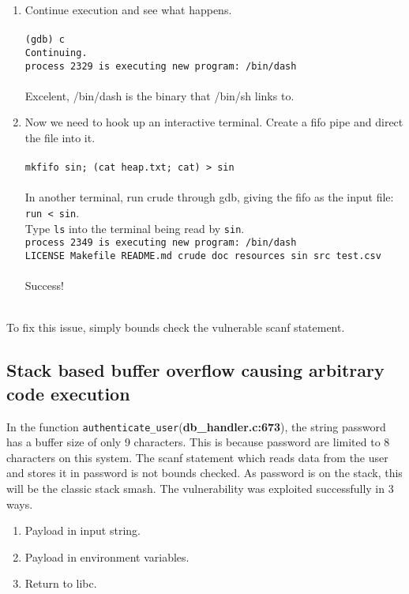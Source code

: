 \documentclass[]{article}
\begin{document}
\begin{enumerate}
	\item Continue execution and see what happens. 
	\\
	\\
	\texttt{(gdb) c\\
		Continuing.\\
		process 2329 is executing new program: /bin/dash}
	\\
	\\
	Excelent, /bin/dash is the binary that /bin/sh links to.
	\item Now we need to hook up an interactive terminal. Create a fifo pipe and direct the file into it.
	\\\\
	\texttt{mkfifo sin; (cat heap.txt; cat) > sin}
	\\
	\\
	In another terminal, run crude through gdb, giving the fifo as the input file: \texttt{run < sin}.\\
	Type \texttt{ls} into the terminal being read by \texttt{sin}.\\
	
	\texttt{process 2349 is executing new program: /bin/dash\\
		LICENSE  Makefile  README.md  crude  doc  resources  sin  src  test.csv}
	\\
	\\
	Success!
\end{enumerate}
	\\
	To fix this issue, simply bounds check the vulnerable scanf statement.

\subsection*{Stack based buffer overflow causing arbitrary code execution}
In the function \texttt{authenticate\_user}(\textbf{db\_handler.c:673}), the string password has a buffer size of only 9 characters. This is because password are limited to 8 characters on this system. The scanf statement which reads data from the user and stores it in password is not bounds checked. As password is on the stack, this will be the classic stack smash. The vulnerability was exploited successfully in 3 ways.
\begin{enumerate}
	\item Payload in input string.
	\item Payload in environment variables.
	\item Return to libc.
\end{enumerate}
\end{document}
